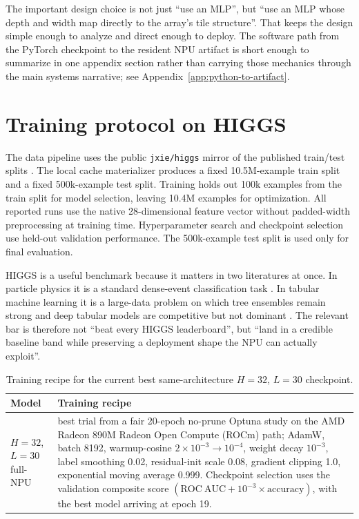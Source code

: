 \documentclass[a4paper,11pt]{article}
\newcommand{\code}[1]{\texttt{#1}}
\begin{document}
The important design choice is not just ``use an MLP'', but ``use an MLP whose
depth and width map directly to the array's tile structure''. That keeps the design
simple enough to analyze and direct enough to deploy. The software path from the
PyTorch checkpoint to the resident NPU artifact is short enough to summarize in
one appendix section rather than carrying those mechanics through the main
systems narrative; see Appendix~\ref{app:python-to-artifact}.

\section{Training protocol on HIGGS}

The data pipeline uses the public \code{jxie/higgs} mirror of the published
train/test splits \cite{jxie-higgs}. The local cache materializer produces a
fixed 10.5M-example train split and a fixed 500k-example test split. Training
holds out 100k examples from the train split for model selection, leaving 10.4M
examples for optimization. All reported runs use the native 28-dimensional
feature vector without padded-width preprocessing at training time.
Hyperparameter search and checkpoint selection use held-out validation
performance. The 500k-example test split is used only for final evaluation.

HIGGS is a useful benchmark because it matters in two literatures at once. In
particle physics it is a standard dense-event classification task
\cite{baldi-higgs,ml4hep-review}. In tabular machine learning it is a large-data
problem on which tree ensembles remain strong and deep tabular models are
competitive but not dominant
\cite{xgboost-kdd,lightgbm-nips,catboost-paper,rtdl-revisiting,grinsztajn-tabular,tabnet,node-paper}.
The relevant bar is therefore not ``beat every HIGGS leaderboard'', but ``land
in a credible baseline band while preserving a deployment shape the NPU can
actually exploit''.

\begin{table}[t]
\centering
\footnotesize
\begin{tabularx}{\textwidth}{@{}lX@{}}
\toprule
Model & Training recipe \\
\midrule
$H=32$, $L=30$ full-NPU &
best trial from a fair 20-epoch no-prune Optuna study on the AMD Radeon 890M
Radeon Open Compute (ROCm) path; AdamW, batch 8192, warmup-cosine
$2\times10^{-3} \rightarrow 10^{-4}$, weight decay $10^{-3}$, label smoothing
0.02, residual-init scale 0.08, gradient clipping 1.0, exponential moving
average 0.999. Checkpoint selection uses the validation composite score
$(\mathrm{ROC\ AUC} + 10^{-3}\!\times\!\mathrm{accuracy})$, with the best model
arriving at epoch 19. \\
\bottomrule
\end{tabularx}
\caption{Training recipe for the current best same-architecture $H=32$, $L=30$
checkpoint.}
\label{tab:training-protocol}
\end{table}
\end{document}
